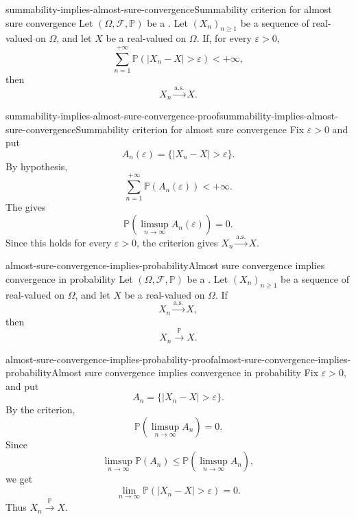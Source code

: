 \documentclass[preview]{standalone}
\begin{document}
\begin{snippetcorollary}{summability-implies-almost-sure-convergence}{Summability criterion for almost sure convergence}
    Let \((\Omega,\mathcal{F},\mathbb{P})\) be a \probabilityspace.
    Let \((X_n)_{n\geq1}\) be a sequence of real-valued
     on \(\Omega\), and let \(X\) be a
    real-valued \randomvariable on \(\Omega\). If, for every
    \(\varepsilon>0\),
    \[
        \sum_{n=1}^{+\infty}
        \mathbb{P}\left(|X_n-X|>\varepsilon\right)
        <+\infty,
    \]
    then
    \[
        X_n\xrightarrow{\mathrm{a.s.}}X.
    \]
\end{snippetcorollary}

\begin{snippetproof}{summability-implies-almost-sure-convergence-proof}{summability-implies-almost-sure-convergence}{Summability criterion for almost sure convergence}
    Fix \(\varepsilon>0\) and put
    \[
        A_n(\varepsilon)=\{|X_n-X|>\varepsilon\}.
    \]
    By hypothesis,
    \[
        \sum_{n=1}^{+\infty}\mathbb{P}(A_n(\varepsilon))<+\infty.
    \]
    The \borelcantellilemma gives
    \[
        \mathbb{P}\left(\limsup_{n\to\infty}A_n(\varepsilon)\right)=0.
    \]
    Since this holds for every \(\varepsilon>0\), the
    \almostsureconvergence criterion gives
    \(X_n\xrightarrow{\mathrm{a.s.}}X\).
\end{snippetproof}

\begin{snippettheorem}{almost-sure-convergence-implies-probability}{Almost sure convergence implies convergence in probability}
    Let \((\Omega,\mathcal{F},\mathbb{P})\) be a \probabilityspace.
    Let \((X_n)_{n\geq1}\) be a sequence of real-valued
     on \(\Omega\), and let \(X\) be a
    real-valued \randomvariable on \(\Omega\). If
    \[
        X_n\xrightarrow{\mathrm{a.s.}}X,
    \]
    then
    \[
        X_n\xrightarrow{\mathbb{P}}X.
    \]
\end{snippettheorem}

\begin{snippetproof}{almost-sure-convergence-implies-probability-proof}{almost-sure-convergence-implies-probability}{Almost sure convergence implies convergence in probability}
    Fix \(\varepsilon>0\), and put
    \[
        A_n=\{|X_n-X|>\varepsilon\}.
    \]
    By the \almostsureconvergence criterion,
    \[
        \mathbb{P}\left(\limsup_{n\to\infty}A_n\right)=0.
    \]
    Since
    \[
        \limsup_{n\to\infty}\mathbb{P}(A_n)
        \leq
        \mathbb{P}\left(\limsup_{n\to\infty}A_n\right),
    \]
    we get
    \[
        \lim_{n\to\infty}\mathbb{P}\left(|X_n-X|>\varepsilon\right)=0.
    \]
    Thus \(X_n\xrightarrow{\mathbb{P}}X\).
\end{snippetproof}
\end{document}
